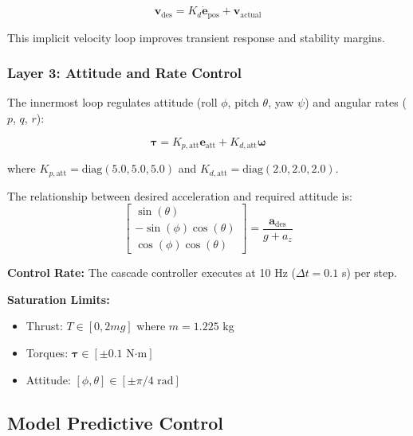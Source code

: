 \documentclass[journal]{IEEEtran}
\begin{document}
\begin{equation}
\mathbf{v}_{\text{des}} = K_d \dot{\mathbf{e}}_{\text{pos}} + \mathbf{v}_{\text{actual}}
\label{eq:vel_control}
\end{equation}

This implicit velocity loop improves transient response and stability margins.

\subsubsection{Layer 3: Attitude and Rate Control}

The innermost loop regulates attitude (roll $\phi$, pitch $\theta$, yaw $\psi$) and angular rates ($p$, $q$, $r$):

\begin{equation}
\boldsymbol{\tau} = K_{p,\text{att}} \mathbf{e}_{\text{att}} + K_{d,\text{att}} \boldsymbol{\omega}
\label{eq:att_control}
\end{equation}

where $K_{p,\text{att}} = \text{diag}(5.0, 5.0, 5.0)$ and $K_{d,\text{att}} = \text{diag}(2.0, 2.0, 2.0)$.

The relationship between desired acceleration and required attitude is:
\begin{equation}
\begin{bmatrix} \sin(\theta) \\ -\sin(\phi)\cos(\theta) \\ \cos(\phi)\cos(\theta) \end{bmatrix} = \frac{\mathbf{a}_{\text{des}}}{g + a_z}
\label{eq:acc_to_att}
\end{equation}

\textbf{Control Rate:} The cascade controller executes at 10 Hz ($\Delta t = 0.1$ s) per step.

\textbf{Saturation Limits:}
\begin{itemize}
    \item Thrust: $T \in [0, 2mg]$ where $m = 1.225$ kg
    \item Torques: $\boldsymbol{\tau} \in [\pm 0.1 \text{ N·m}]$
    \item Attitude: $[\phi, \theta] \in [\pm \pi/4 \text{ rad}]$
\end{itemize}

\subsection{Model Predictive Control}
\end{document}
